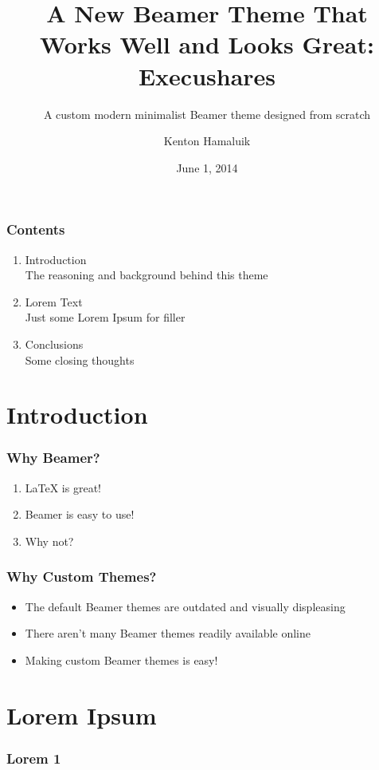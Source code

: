 \documentclass{beamer}
\title{A New Beamer Theme That Works Well and Looks Great: Execushares}
\subtitle{A custom modern minimalist Beamer theme designed from scratch}
\author{Kenton Hamaluik}
\date{June 1, 2014}
\begin{document}
	\setcounter{showProgressBar}{0}
	\setcounter{showSlideNumbers}{0}

	\frame{\titlepage}

	\begin{frame}
		\frametitle{Contents}
		\begin{enumerate}
			\item Introduction \\ \textcolor{ExecusharesGrey}{\footnotesize\hspace{1em} The reasoning and background behind this theme}
			\item Lorem Text  \\ \textcolor{ExecusharesGrey}{\footnotesize\hspace{1em} Just some Lorem Ipsum for filler}
			\item Conclusions \\ \textcolor{ExecusharesGrey}{\footnotesize\hspace{1em} Some closing thoughts}
		\end{enumerate}
	\end{frame}

	\setcounter{framenumber}{0}
	\setcounter{showProgressBar}{1}
	\setcounter{showSlideNumbers}{1}
	\section{Introduction}
		\begin{frame}
			\frametitle{Why Beamer?}
			\begin{enumerate}
				\item LaTeX is great!
				\item Beamer is easy to use!
				\item Why not?
			\end{enumerate}
		\end{frame}

		\begin{frame}
			\frametitle{Why Custom Themes?}
			\begin{itemize}
				\item The default Beamer themes are outdated and visually displeasing
				\item There aren't many Beamer themes readily available online
				\item Making custom Beamer themes is easy!
			\end{itemize}
		\end{frame}

	\section{Lorem Ipsum}
		\begin{frame}
			\frametitle{Lorem 1}
			\blindtext
		\end{frame}
\end{document}

